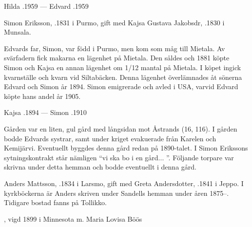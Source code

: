 Hilda .1959  ---  Edvard .1959



%
Simon Eriksson,  .1831 i Purmo, gift med Kajsa Gustava Jakobsdr, .1830 i Munsala.
\begin{jhchildren}
  \item {}
  \item {}
  \item {}
  \item {}
  \item {}
\end{jhchildren}

Edvards far, Simon, var född i Purmo, men kom som måg till Mietala. Av svärfadern fick makarna en lägenhet på Mietala. Den såldes och 1881 köpte Simon och Kajsa en annan lägenhet om 1/12 mantal på Mietala. I köpet ingick kvarnställe och kvarn vid Siltabäcken. Denna lägenhet överlämnades åt sönerna Edvard och Simon år 1894. Simon emigrerade och avled i USA, varvid Edvard köpte hans andel år 1905.

Kajsa .1894  ---	Simon .1910


%

Gården var en liten, gul gård med långsidan mot Åstrands (16, 116).	I gården bodde Edvards systrar, samt under kriget evakuerade från Karelen och Kemijärvi. Eventuellt byggdes denna gård redan på 1890-talet. I Simon Erikssons sytningskontrakt står nämligen ``vi ska bo i en gård... ''. Följande torpare var skrivna under detta hemman och bodde eventuellt i denna gård.


%
Anders Mattsson, .1834 i Larsmo, gift med Greta Andersdotter, .1841 i Jeppo. I kyrkböckerna är Anders skriven under Sandells hemman under åren 1875--. Tidigare bostad fanns på Tollikko.
\begin{jhchildren}
  \item {}, vigd 1899 i  Minnesota m. Maria Lovisa Böös
  \item {}
\end{jhchildren}


